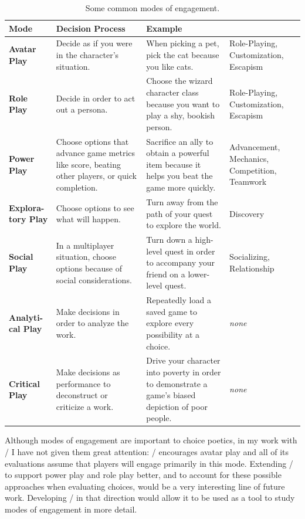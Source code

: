 \begin{table}[!p]
\begingroup
\renewcommand*{\arraystretch}{1.5}
\begin{tabular}{p{5em}p{10em}p{10em}p{6.9em}}
\toprule
\textbf{Mode} & \textbf{Decision Process} & \textbf{Example} & \textbf{\citep{Yee2006}} \\
\midrule
\textbf{Avatar Play} & Decide as if you were in the character's situation. & When picking a pet, pick the cat because you like cats. & Role-Playing, Customization, Escapism \\
\textbf{Role Play} & Decide in order to act out a persona. & Choose the wizard character class because you want to play a shy, bookish person. & Role-Playing, Customization, Escapism \\
\textbf{Power Play} & Choose options that advance game metrics like score, beating other players, or quick completion. & Sacrifice an ally to obtain a powerful item because it helps you beat the game more quickly. & Advancement, Mechanics, Competition, Teamwork \\
\textbf{Explora-tory Play} & Choose options to see what will happen. & Turn away from the path of your quest to explore the world. & Discovery \\
\textbf{Social Play} & In a multiplayer situation, choose options because of social considerations. & Turn down a high-level quest in order to accompany your friend on a lower-level quest. & Socializing, \newline Relationship \\
\textbf{Analyti-cal Play} & Make decisions in order to analyze the work. & Repeatedly load a saved game to explore every possibility at a choice. & \emph{none} \\
\textbf{Critical Play} & Make decisions as performance to deconstruct or criticize a work. & Drive your character into poverty in order to demonstrate a game's biased depiction of poor people. & \emph{none} \\
\bottomrule
\end{tabular}
\endgroup
\caption[Modes of engagement]{Some common modes of engagement.}
\label{tab:modes-of-engagement}
\end{table}

Although modes of engagement are important to choice poetics, in my work with \dunyazad/ I have not given them great attention: \dunyazad/ encourages avatar play and all of its evaluations assume that players will engage primarily in this mode.
%
Extending \dunyazad/ to support power play and role play better, and to account for these possible approaches when evaluating choices, would be a very interesting line of future work.
%
Developing \dunyazad/ in that direction would allow it to be used as a tool to study modes of engagement in more detail.


